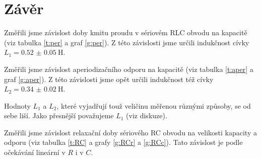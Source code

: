 \section*{Závěr}
Změřili jsme závislost doby kmitu proudu v sériovém RLC obvodu na kapacitě (viz tabulka \ref{t:per} a graf \ref{g:per}).
Z této závislosti jsme určili indukčnost cívky $L_1=\SI{0.52(5)}{\henry}$.

Změřili jsme závislost aperiodizačního odporu na kapacitě (viz tabulka \ref{t:aper} a graf \ref{g:aper}).
Z této závislosti jsme opět určili indukčnost též cívky $L_2=\SI{0.34(2)}{\henry}$.

Hodnoty $L_1$ a $L_2$, které vyjadřují touž veličinu měřenou různými způsoby, se od sebe liší. Jako přesnější považujeme $L_1$ (viz diskuze).

Změřili jsme závislost relaxační doby sériového RC obvodu na velikosti kapacity a odporu (viz tabulka \ref{t:RC} a grafy \ref{g:RCr} a \ref{g:RCc}). Tato závislost je podle očekávání lineární v $R$ i v $C$.